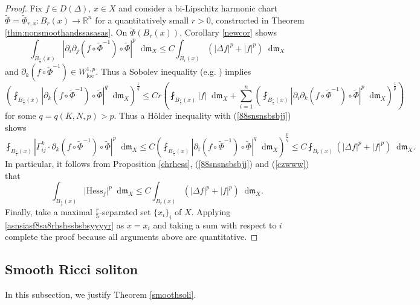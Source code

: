 \documentclass[11pt,reqno]{amsart}
\theoremstyle{definition}
\numberwithin{equation}{section}
\newcommand{\di}{\mathop{}\!\mathrm{d}}
\newcommand{\meas}{\mathfrak{m}}
\DeclareMathOperator{\loc}{loc}
\begin{document}
\begin{proof}
Fix $f \in D(\Delta)$, $x \in X$ and consider a bi-Lipschitz harmonic chart $\tilde \Phi=\tilde \Phi_{r,x}:B_r(x) \to \mathbb{R}^n$ for a quantitatively small $r>0$, constructed in Theorem \ref{thm:nonsmoothandssasasas}. On $\tilde{\Phi}(B_r(x))$, Corollary \ref{newcor} shows
\begin{equation}\label{88snsnsbsbjj}
    \int_{B_{\frac{r}{5}}(x)}|\partial_i\partial_j(f\circ \tilde \Phi^{-1})\circ \tilde\Phi|^p\di\meas_X\le C\int_{B_r(x)}\left(|\Delta f|^p +|f|^p\right)\di \meas_X
\end{equation}
and $\partial_k (f \circ \tilde \Phi^{-1}) \in W^{1,p}_{\loc}$. Thus a Sobolev inequality (e.g. \cite{HK}) implies
\begin{equation*}
    \left(\fint_{B_{\frac{r}{5}}(x)}\left|\partial_k (f \circ \tilde \Phi^{-1})\circ \tilde \Phi\right|^q \di \meas_X\right)^{\frac{1}{q}} \le Cr \left(\fint_{B_{\frac{r}{5}}(x)}|f|\di \meas_X+\sum_{i=1}^n\left( \fint_{B_{\frac{r}{5}}(x)}|\partial_i\partial_k(f \circ \tilde \Phi^{-1})\circ \tilde \Phi|^p\di \meas_X\right)^{\frac{1}{p}}\right)
\end{equation*}
for some $q=q(K, N, p)>p$.
Thus a H\"older inequality with (\ref{88snsnsbsbjj}) shows
\begin{equation}\label{czwww}
    \fint_{B_{\frac{r}{5}}(x)}|\Gamma_{ij}^k\cdot \partial_k(f\circ \tilde\Phi^{-1})\circ \tilde \Phi|^p\di\meas_X\le  C\left(\fint_{B_{\frac{r}{5}}(x)}\left|\partial_i (f \circ \tilde \Phi^{-1})\circ \tilde \Phi\right|^q \di \meas_X\right)^{\frac{p}{q}}
    \le C\fint_{B_r(x)}\left(|\Delta f|^p +|f|^p\right)\di \meas_X.
\end{equation}
In particular, it follows from Proposition \ref{chrhess}, (\ref{88snsnsbsbjj})  and (\ref{czwww}) that 
\begin{equation}\label{asnsiasf8sa8rhshssbsbsyyyyr}
    \int_{B_{\frac{r}{5}}(x)}|\mathrm{Hess}_f|^p\di \meas_X \le C\int_{B_r(x)}\left(|\Delta f|^p +|f|^p\right)\di \meas_X.
\end{equation}
Finally, take a maximal $\frac{r}{5}$-separated set $\{x_i\}_i$ of $X$. Applying \eqref{asnsiasf8sa8rhshssbsbsyyyyr} as $x=x_i$ and taking a sum with respect to $i$ complete the proof because all arguments above are quantitative.
\end{proof}


\subsection{Smooth Ricci soliton}\label{smoothapp}
In this subsection, we justify Theorem \ref{smoothsoli}.
\end{document}
